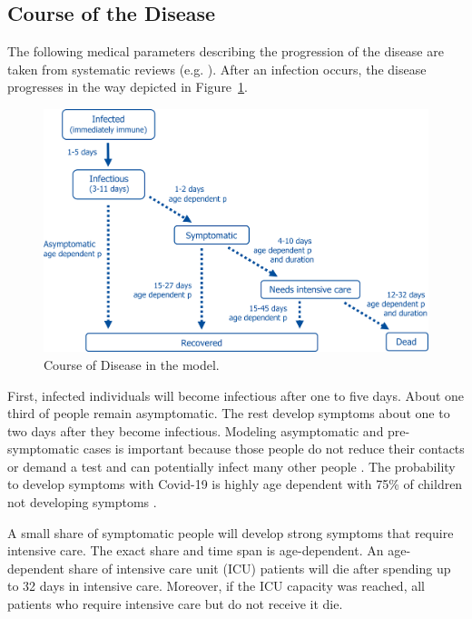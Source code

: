\subsection{Course of the Disease}
\label{sub:course_of_disease}

The following medical parameters describing the progression of the disease are taken from
systematic reviews (e.g. \citet{He2020}). After an infection occurs, the disease
progresses in the way depicted in Figure~\ref{fig:course_of_disease}.

\begin{figure}[!tp]
    \includegraphics[width=\textwidth]{../figures/disease_progression.png}
    \caption{Course of Disease in the model.}
    \label{fig:course_of_disease}
\end{figure}

First, infected individuals will become infectious after one to five days. About one
third of people remain asymptomatic. The rest develop symptoms about one to two days
after they become infectious. Modeling asymptomatic and pre-symptomatic cases is
important because those people do not reduce their contacts or demand a test and can
potentially infect many other people \citep{Donsimoni2020}. The probability to develop
symptoms with Covid-19 is highly age dependent with 75\% of children not developing
symptoms \citep{Davies2020}.

A small share of symptomatic people will develop strong symptoms that require intensive
care. The exact share and time span is age-dependent. An age-dependent share of intensive
care unit (ICU) patients will die after spending up to 32 days in intensive care.
Moreover, if the ICU capacity was reached, all patients who require intensive care but do
not receive it die.

